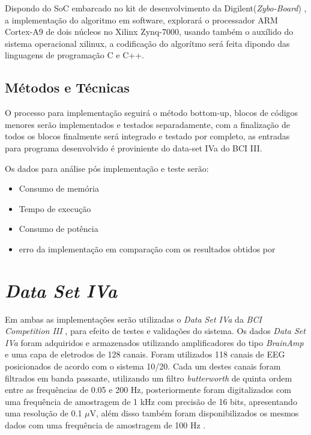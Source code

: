 Dispondo do SoC embarcado no kit de desenvolvimento da Digilent(\textit{Zybo-Board}) , a implementação do algoritmo em 
software, explorará o processador ARM Cortex-A9 de dois núcleos no Xilinx Zynq-7000, usando também
o auxílido do sistema operacional xilinux, a codificação do algorítmo será feita dipondo das linguagens de programação
C e C++.

\subsection{Métodos e Técnicas}

O processo para implementação seguirá o método bottom-up, blocos de códigos menores serão implementados e testados
separadamente, com a finalização de todos os blocos finalmente será integrado e testado por completo, as entradas
para programa desenvolvido é proviniente do data-set IVa do BCI III.
 
Os dados para análise pós implementação e teste serão: 

\begin{itemize}
\item Consumo de memória
\item Tempo de execução
\item Consumo de potência
\item erro da implementação em comparação com os resultados obtidos por \cite{F.lotte}
\end{itemize}













\section{\textit{Data Set IVa}}

Em ambas as implementações serão utilizadas o \textit{Data Set IVa} da \textit{BCI Competition III} \cite{BCICompetition}, para efeito de testes e validações do sistema.
Os dados \textit{Data Set IVa} foram adquiridos e armazenados utilizando amplificadores do tipo \textit{BrainAmp} e uma capa de eletrodos de 128 canais. Foram utilizados 118 canais de EEG posicionados de acordo com o sistema 10/20. Cada um destes canais foram filtrados em banda passante, utilizando um filtro \textit{butterworth} de quinta ordem entre as frequências de 0.05 e 200 Hz, posteriormente foram digitalizados com uma frequência de amostragem de 1 kHz com precisão de 16 bits, apresentando uma resolução de 0.1 $\mu$V, além disso também foram disponibilizados os mesmos dados com uma frequência de amostragem de 100 Hz \cite{siteBCI}.


